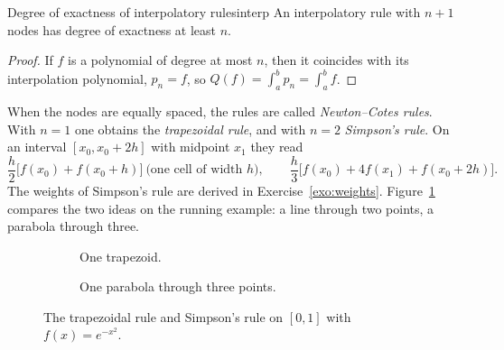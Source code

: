 \documentclass[11pt,a4paper,twoside,openright]{book}
\newcounter{exo}[chapter]
\begin{document}
\begin{theorem}{Degree of exactness of interpolatory rules}{interp}
An interpolatory rule with $n+1$ nodes has degree of exactness at least $n$.
\end{theorem}
\begin{proof}
If $f$ is a polynomial of degree at most $n$, then it coincides with its interpolation polynomial, $p_n=f$, so $Q(f)=\int_a^b p_n=\int_a^b f$.
\end{proof}

When the nodes are equally spaced, the rules are called \emph{Newton--Cotes rules}.
With $n=1$ one obtains the \emph{trapezoidal rule}, and with $n=2$ \emph{Simpson's rule}.
On an interval $[x_0,x_0+2h]$ with midpoint $x_1$ they read
\[
  \frac{h}{2}\bigl[f(x_0)+f(x_0+h)\bigr]\ \text{(one cell of width $h$)},\qquad
  \frac{h}{3}\bigl[f(x_0)+4f(x_1)+f(x_0+2h)\bigr].
\]
The weights of Simpson's rule are derived in Exercise~\ref{exo:weights}.
Figure~\ref{fig:tsgeom} compares the two ideas on the running example: a line through two points, a parabola through three.

\begin{figure}[htbp]
  \centering
  \begin{subfigure}[t]{0.48\textwidth}
    \centering
    \caption{One trapezoid.}
  \end{subfigure}\hfill
  \begin{subfigure}[t]{0.48\textwidth}
    \centering
    \caption{One parabola through three points.}
  \end{subfigure}
  \caption{The trapezoidal rule and Simpson's rule on $[0,1]$ with $f(x)=e^{-x^{2}}$.}
  \label{fig:tsgeom}
\end{figure}
\end{document}
